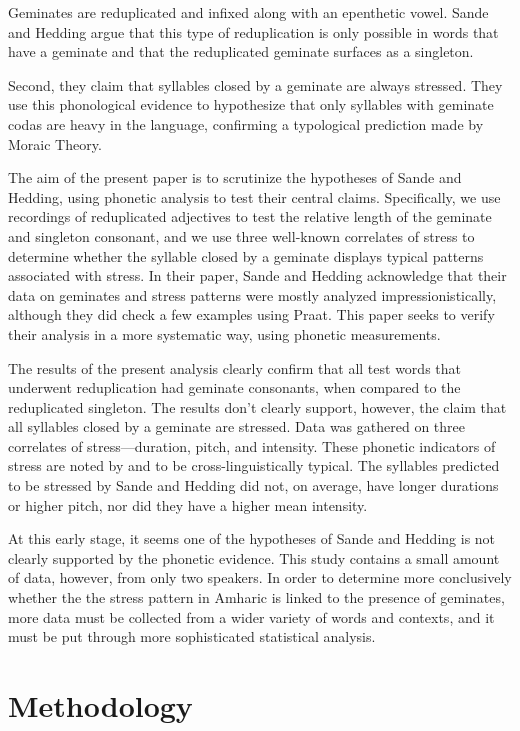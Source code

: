 \documentclass[12pt]{scrartcl}
\begin{document}
Geminates are reduplicated and infixed along with an epenthetic vowel. Sande and Hedding argue that this type of reduplication is only possible in words that have a geminate and that the reduplicated geminate surfaces as a singleton. 

Second, they claim that syllables closed by a geminate are always stressed. They use this phonological evidence to hypothesize that only syllables with geminate codas are heavy in the language, confirming a typological prediction made by Moraic Theory.

The aim of the present paper is to scrutinize the hypotheses of Sande and Hedding, using phonetic analysis to test their central claims. Specifically, we use recordings of reduplicated adjectives to test the relative length of the geminate and singleton consonant, and we use three well-known correlates of stress to determine whether the syllable closed by a geminate displays typical patterns associated with stress. In their paper, Sande and Hedding acknowledge that their data on geminates and stress patterns were mostly analyzed impressionistically, although they did check a few examples using Praat. This paper seeks to verify their analysis in a more systematic way, using phonetic measurements. 

The results of the present analysis clearly confirm that all test words that underwent reduplication had geminate consonants, when compared to the reduplicated singleton. The results don't clearly support, however, the claim that all syllables closed by a geminate are stressed. Data was gathered on three correlates of stress---duration, pitch, and intensity. These phonetic indicators of stress are noted by \cite{hayes} and \cite{fox} to be cross-linguistically typical. The syllables predicted to be stressed by Sande and Hedding did not, on average, have longer durations or higher pitch, nor did they have a higher mean intensity. 

At this early stage, it seems one of the hypotheses of Sande and Hedding is not clearly supported by the phonetic evidence. This study contains a small amount of data, however, from only two speakers. In order to determine more conclusively whether the the stress pattern in Amharic is linked to the presence of geminates, more data must be collected from a wider variety of words and contexts, and it must be put through more sophisticated statistical analysis.

\section{Methodology}
\end{document}
